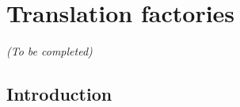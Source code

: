 


\section{Translation factories}
\label{sec:translation_factories}



\begin{center}
	\textit{(To be completed)}
\end{center}

\subsection{Introduction}
\label{subsec:introduction_translation_factories}




